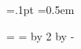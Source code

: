 
\barwidth=.1pt       %
\barheight=2pt       %
\intersecwidth=0.5em %



\def\vdecor{\hskip\hmargin plus1fil
  \hskip\barwidth plus1fil
  \hskip\hmargin plus1fil}







\newdimen\fullhsize          %
\newdimen\itmwid             %
\newdimen\dfnwid             %
\newdimen\idnwid             %
\newdimen\temp               %


\newdimen\altitmwid        %
\newdimen\altdfnwid        %

%

\fullhsize=\totalwidth
\temp=\hmargin
\multiply \temp by 2
\advance \fullhsize by -\temp


